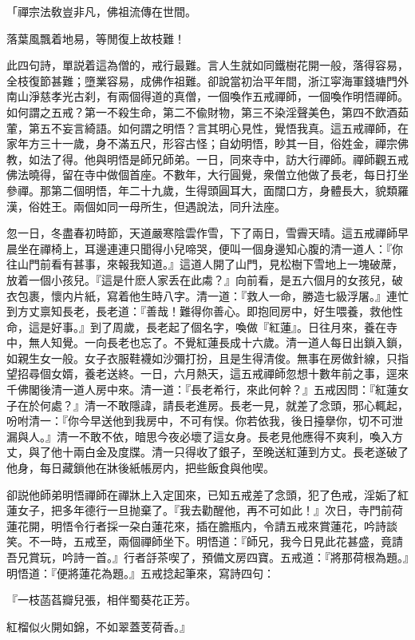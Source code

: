 「禪宗法敎豈非凡，佛祖流傳在世間。

落葉風飄着地易，等閒復上故枝難！

此四句詩，單説着這為僧的，戒行最難。言人生就如同鐵樹花開一般，落得容易，全枝復節甚難；墮業容易，成佛作祖難。卻說當初治平年間，浙江寜海軍錢塘門外南山淨慈孝光古刹，有兩個得道的真僧，一個喚作五戒禪師，一個喚作明悟禪師。如何謂之五戒？第一不殺生命，第二不偸財物，第三不染淫聲美色，第四不飲酒茹葷，第五不妄言綺語。如何謂之明悟？言其明心見性，覺悟我真。這五戒禪師，在家年方三十一歲，身不滿五尺，形容古怪；自幼明悟，眇其一目，俗姓金，禪宗佛教，如法了得。他與明悟是師兄師弟。一日，同來寺中，訪大行禪師。禪師觀五戒佛法曉得，留在寺中做個首座。不數年，大行圓覺，衆僧立他做了長老，每日打坐參禪。那第二個明悟，年二十九歲，生得頭圓耳大，面闊口方，身體長大，貌類羅漢，俗姓王。兩個如同一母所生，但遇說法，同升法座。

忽一日，冬盡春初時節，天道嚴寒陰雲作雪，下了兩日，雪霽天晴。這五戒禪師早晨坐在禪椅上，耳邊連連只聞得小兒啼哭，便叫一個身邊知心腹的清一道人：『你往山門前看有甚事，來報我知道。』這道人開了山門，見松樹下雪地上一塊破蓆，放着一個小孩兒。『這是什麽人家丢在此䖏？』向前看，是五六個月的女孩兒，破衣包裹，懷内片紙，寫着他生時八字。清一道：『救人一命，勝造七級浮屠。』連忙到方丈禀知長老，長老道：『善哉！難得你善心。即抱囘房中，好生喂養，救他性命，這是好事。』到了周歲，長老起了個名字，喚做『紅蓮』。日往月來，養在寺中，無人知覺。一向長老也忘了。不覺紅蓮長成十六歲。清一道人每日出鎖入鎖，如親生女一般。女子衣服鞋襪如沙彌打扮，且是生得清俊。無事在房做針線，只指望招尋個女婿，養老送終。一日，六月熱天，這五戒禪師忽想十數年前之事，逕來千佛閣後清一道人房中來。清一道：『長老希行，來此何幹？』五戒因問：『紅蓮女子在於何處？』清一不敢隱諱，請長老進房。長老一見，就差了念頭，邪心輒起，吩咐清一：『你今早送他到我房中，不可有悮。你若依我，後日擡擧你，切不可泄漏與人。』清一不敢不依，暗思今夜必壞了這女身。長老見他應得不爽利，喚入方丈，與了他十兩白金及度牒。清一只得收了銀子，至晚送紅蓮到方丈。長老遂破了他身，每日藏鎖他在牀後紙帳房内，把些飯食與他喫。

卻説他師弟明悟禪師在禪牀上入定囬來，已知五戒差了念頭，犯了色戒，淫姤了紅蓮女子，把多年德行一旦抛棄了。『我去勸醒他，再不可如此！』次日，寺門前荷蓮花開，明悟令行者採一朶白蓮花來，插在膽瓶内，令請五戒來賞蓮花，吟詩談笑。不一時，五戒至，兩個禪師坐下。明悟道：『師兄，我今日見此花甚盛，竟請吾兄賞玩，吟詩一首。』行者㧱茶喫了，預備文房四寶。五戒道：『將那荷根為題。』明悟道：『便將蓮花為題。』五戒捻起筆來，寫詩四句：

『一枝菡萏瓣兒張，相伴蜀葵花正芳。

紅榴似火開如錦，不如翠蓋芰荷香。』

